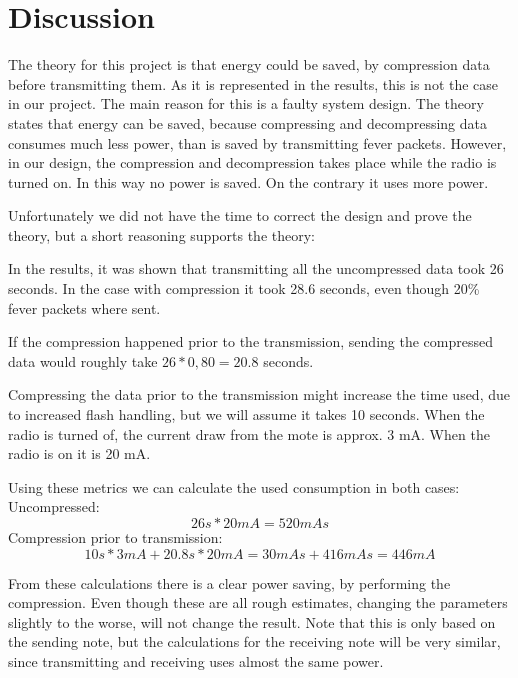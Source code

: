 \chapter{Discussion}

The theory for this project is that energy could be saved, by compression data before transmitting them. As it is represented in the results, this is not the case in our project. The main reason for this is a faulty system design. 
The theory states that energy can be saved, because compressing and decompressing data consumes much less power, than is saved by transmitting fever packets.
However, in our design, the compression and decompression takes place while the radio is turned on. In this way no power is saved. On the contrary it uses more power.

Unfortunately we did not have the time to correct the design and prove the theory, but a short reasoning supports the theory:

In the results, it was shown that transmitting all the uncompressed data took 26 seconds. In the case with compression it took 28.6 seconds, even though 20\% fever packets where sent. 

If the compression happened prior to the transmission, sending the compressed data would roughly take $26*0,80 = 20.8$ seconds. 

Compressing the data prior to the transmission might increase the time used, due to increased flash handling, but we will assume it takes 10 seconds.
When the radio is turned of, the current draw from the mote is approx. 3 mA. When the radio is on it is 20 mA. 

Using these metrics we can calculate the used consumption in both cases:\\
Uncompressed:
\begin{equation}
26 s * 20 mA = 520 mAs
\end{equation}
Compression prior to transmission:
\begin{equation}
10 s * 3 mA + 20.8 s * 20 mA = 30 mAs + 416 mAs  = 446 mA
\end{equation}

From these calculations there is a clear power saving, by performing the compression. Even though these are all rough estimates, changing the parameters slightly to the worse, will not change the result.
Note that this is only based on the sending note, but the calculations for the receiving note will be very similar, since transmitting and receiving uses almost the same power.